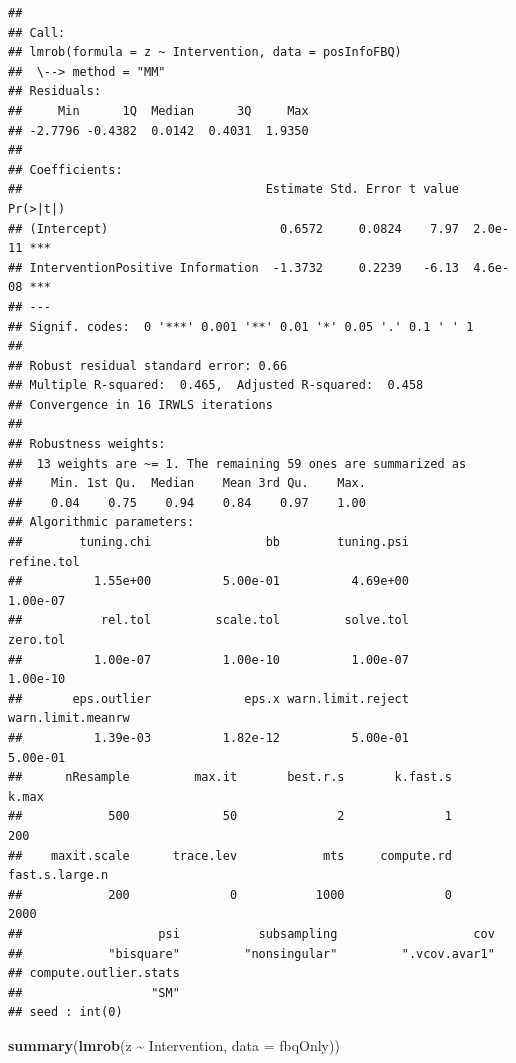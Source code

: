 \documentclass[
]{article}
\newenvironment{Shaded}{\begin{snugshade}}{\end{snugshade}}
\newcommand{\AttributeTok}[1]{\textcolor[rgb]{0.13,0.29,0.53}{#1}}
\newcommand{\FunctionTok}[1]{\textcolor[rgb]{0.13,0.29,0.53}{\textbf{#1}}}
\newcommand{\NormalTok}[1]{#1}
\newcommand{\SpecialCharTok}[1]{\textcolor[rgb]{0.81,0.36,0.00}{\textbf{#1}}}
\begin{document}
\begin{verbatim}
## 
## Call:
## lmrob(formula = z ~ Intervention, data = posInfoFBQ)
##  \--> method = "MM"
## Residuals:
##     Min      1Q  Median      3Q     Max 
## -2.7796 -0.4382  0.0142  0.4031  1.9350 
## 
## Coefficients:
##                                  Estimate Std. Error t value Pr(>|t|)    
## (Intercept)                        0.6572     0.0824    7.97  2.0e-11 ***
## InterventionPositive Information  -1.3732     0.2239   -6.13  4.6e-08 ***
## ---
## Signif. codes:  0 '***' 0.001 '**' 0.01 '*' 0.05 '.' 0.1 ' ' 1
## 
## Robust residual standard error: 0.66 
## Multiple R-squared:  0.465,  Adjusted R-squared:  0.458 
## Convergence in 16 IRWLS iterations
## 
## Robustness weights: 
##  13 weights are ~= 1. The remaining 59 ones are summarized as
##    Min. 1st Qu.  Median    Mean 3rd Qu.    Max. 
##    0.04    0.75    0.94    0.84    0.97    1.00 
## Algorithmic parameters: 
##        tuning.chi                bb        tuning.psi        refine.tol 
##          1.55e+00          5.00e-01          4.69e+00          1.00e-07 
##           rel.tol         scale.tol         solve.tol          zero.tol 
##          1.00e-07          1.00e-10          1.00e-07          1.00e-10 
##       eps.outlier             eps.x warn.limit.reject warn.limit.meanrw 
##          1.39e-03          1.82e-12          5.00e-01          5.00e-01 
##      nResample         max.it       best.r.s       k.fast.s          k.max 
##            500             50              2              1            200 
##    maxit.scale      trace.lev            mts     compute.rd fast.s.large.n 
##            200              0           1000              0           2000 
##                   psi           subsampling                   cov 
##            "bisquare"         "nonsingular"         ".vcov.avar1" 
## compute.outlier.stats 
##                  "SM" 
## seed : int(0)
\end{verbatim}

\begin{Shaded}
\begin{Highlighting}[]
    \FunctionTok{summary}\NormalTok{(}\FunctionTok{lmrob}\NormalTok{(z }\SpecialCharTok{\textasciitilde{}}\NormalTok{ Intervention, }\AttributeTok{data =}\NormalTok{ fbqOnly))}
\end{Highlighting}
\end{Shaded}
\end{document}
